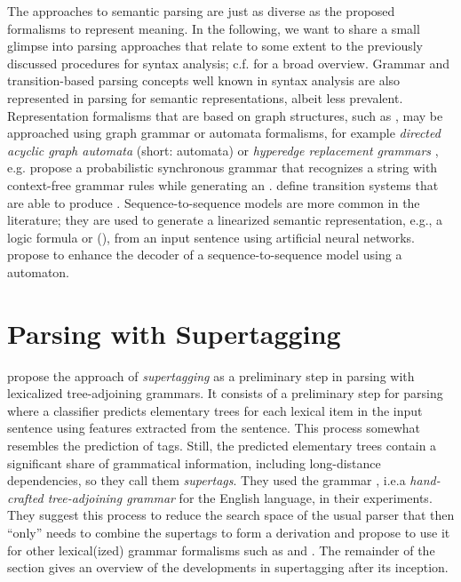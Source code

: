 \documentclass[../document.tex]{subfiles}
\begin{document}
    The approaches to semantic parsing are just as diverse as the proposed formalisms to represent meaning.
    In the following, we  want to share a small glimpse into parsing approaches that relate to some extent to the previously discussed procedures for syntax analysis; c.f.\@ \citet{kamath2018survey} for a broad overview.
    Grammar and transition-based parsing concepts well known in syntax analysis are also represented in parsing for semantic representations, albeit less prevalent.
    Representation formalisms that are based on graph structures, such as , may be approached using graph grammar or automata formalisms, for example \emph{directed acyclic graph automata} (short:  automata) \citep{fancellu2019semantic} or \emph{hyperedge replacement grammars} \citep{drewes1997hyperedge}, e.g.\@ \citet{peng2015synchronous} propose a probabilistic synchronous grammar that recognizes a string with context-free grammar rules while generating an .
    \citet{peng2018amr,vilares-gomez-rodriguez-2018-transition} define transition systems that are able to produce .
    Sequence-to-sequence models are more common in the literature; they are used to generate a linearized semantic representation, e.g.\@, a logic formula \citep{dong-lapata-2016-language} or  (\citep{zhang-etal-2019-amr}), from an input sentence using artificial neural networks.
    \citet{fancellu2019semantic} propose to enhance the decoder of a sequence-to-sequence model using a  automaton.

    \section{Parsing with Supertagging}\label{sec:literature:supertagging}
    \citet{bangalore1999supertagging} propose the approach of \emph{supertagging} as a preliminary step in parsing with lexicalized tree-adjoining grammars.
    It consists of a preliminary step for parsing where a classifier predicts elementary trees for each lexical item in the input sentence using features extracted from the sentence.
    This process somewhat resembles the prediction of  tags. Still, the predicted elementary trees contain a significant share of grammatical information, including long-distance dependencies, so they call them \emph{supertags}.
    They used the  grammar \citep{xtag01}, i.e.\@ a \emph{hand-crafted tree-adjoining grammar} for the English language, in their experiments. 
    They suggest this process to reduce the search space of the usual parser that then ``only'' needs to combine the supertags to form a derivation and propose to use it for other lexical(ized) grammar formalisms such as  and .
    The remainder of the section gives an overview of the developments in supertagging after its inception.
\end{document}
